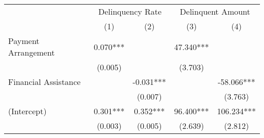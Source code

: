 \begin{tabular}{lcccc}
\toprule 
\midrule 
 & \multicolumn{2}{c}{Delinquency Rate} & \multicolumn{2}{c}{Delinquent Amount} \\
 \cmidrule(lr){2-3} \cmidrule(lr){4-5} 
 & (1) & (2) & (3) & (4) \\
\midrule 
Payment Arrangement & 0.070*** &  & 47.340*** &  \\
 & (0.005) &  & (3.703) &  \\
Financial Assistance &  & -0.031*** &  & -58.066*** \\
 &  & (0.007) &  & (3.763) \\
(Intercept) & 0.301*** & 0.352*** & 96.400*** & 106.234*** \\
 & (0.003) & (0.005) & (2.639) & (2.812) \\
\midrule 
\bottomrule 
\end{tabular}
